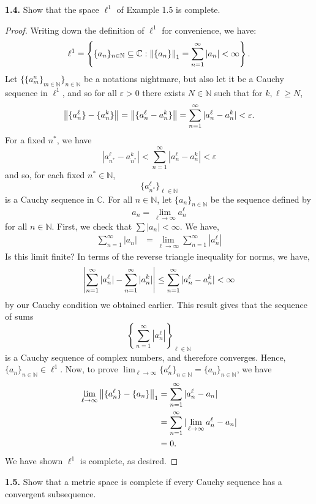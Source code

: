 \documentclass[12pt]{article}
\theoremstyle{definition}
\begin{document}
	\newpage 
	\noindent \textbf{1.4.} Show that the space $\ell^1$ of Example 1.5 is complete. 
		\begin{proof}
			Writing down the definition of $\ell^1$ for convenience, we have:
				$$\ell^1 = \left\{\{a_n\}_{n \in \mathbb{N}} \subseteq \mathbb{C} : \norm{\{a_n\}}_1 = \sum_{n = 1}^\infty |a_n| < \infty \right\}.$$ 
			Let $\{\{a_m^n\}_{m \in \mathbb{N}}\}_{n \in \mathbb{N}}$ be a notations nightmare, but also let it be a Cauchy sequence in $\ell^1$, and so for all $\varepsilon > 0$ there exists $N \in \mathbb{N}$ such that for $k, \ell \geq N$, $$\norm{\{a_n^\ell\} - \{a_n^k\}} =  \norm{\{a_n^\ell - a_n^k\}} = \sum_{n = 1}^\infty |a_n^\ell - a_n^k| < \varepsilon.$$ For a fixed $n^\ast$, we have $$|a_{n^\ast}^\ell - a_{n^\ast}^k| < \sum_{n = 1}^\infty |a_n^\ell - a_n^k| < \varepsilon$$ and so, for each fixed $n^\ast \in \mathbb{N}$, $$\{a_{n^\ast}^\ell\}_{\ell \in \mathbb{N} }$$ is a Cauchy sequence in $\mathbb{C}$. For all $n \in \mathbb{N}$, let $\{a_n\}_{n \in \mathbb{N}}$ be the sequence defined by $$a_n = \lim_{\ell \to \infty} a_n^\ell$$ for all $n \in \mathbb{N}.$ First, we check that $\sum |a_n| < \infty$. We have,
				\begin{align*}
					\sum_{n = 1}^\infty |a_n| &= \lim_{\ell \to \infty}\sum_{n = 1}^\infty |a_n^\ell| 
				\end{align*} 
			Is this limit finite? In terms of the reverse triangle inequality for norms, we have, $$\abs{\sum_{n = 1}^\infty |a_n^\ell| - \sum_{n = 1}^\infty |a_n^k|} \leq \sum_{n = 1}^\infty |a_n^\ell - a_n^k| < \infty$$ by our Cauchy condition we obtained earlier. This result gives that the sequence of sums $$\left\{\sum_{n = 1}^\infty |a_n^\ell|\right\}_{\ell \in \mathbb{N}}$$ is a Cauchy sequence of complex numbers, and therefore converges. Hence, $\{a_n\}_{n \in \mathbb{N}} \in \ell^1$. Now, to prove $\lim_{\ell \to \infty} \{a_n^\ell\}_{n \in \mathbb{N}} = \{a_n\}_{n \in \mathbb{N}}$, we have
				\begin{align*}
					\lim_{\ell \to \infty} \norm{\{a_n^\ell\} - \{a_n\}}_1 &= \sum_{n = 1}^\infty |a_n^\ell - a_n| \\
					&= \sum_{n = 1}^\infty |\lim_{\ell \to \infty} a_n^\ell - a_n| \\
					&= 0.
				\end{align*}
			We have shown $\ell^1$ is complete, as desired. 
		\end{proof} 

\noindent \textbf{1.5.} Show that a metric space is complete if every Cauchy sequence has a convergent subsequence. 
\end{document}

